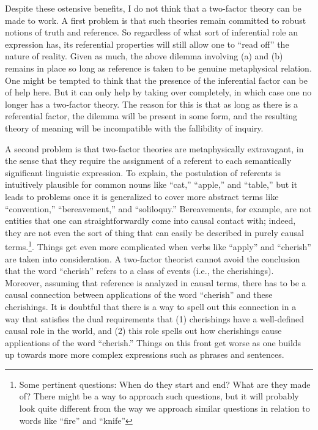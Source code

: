 Despite these ostensive benefits, I do not think that a two-factor theory can be made to work. A first problem is that such theories remain committed to robust notions of truth and reference. So regardless of what sort of inferential role an expression has, its referential properties will still allow one to ``read off'' the nature of reality. Given as much, the above dilemma involving (a) and (b) remains in place so long as reference is taken to be genuine metaphysical relation. One might be tempted to think that the presence of the inferential factor can be of help here. But it can only help by taking over completely, in which case one no longer has a two-factor theory. The reason for this is that as long as there is a referential factor, the dilemma will be present in some form, and the resulting theory of meaning will be incompatible with the fallibility of inquiry. 

A second problem is that two-factor theories are metaphysically extravagant, in the sense that they require the assignment of a referent to each semantically significant linguistic expression. To explain, the postulation of referents is intuitively plausible for common nouns like ``cat,'' ``apple,'' and ``table,'' but it leads to problems once it is generalized to cover more abstract terms like ``convention,'' ``bereavement,'' and ``soliloquy.'' Bereavements, for example, are not entities that one can straightforwardly come into causal contact with; indeed, they are not even the sort of thing that can easily be described in purely causal terms.\footnote{Some pertinent questions: When do they start and end? What are they made of? There might be a way to approach such questions, but it will probably look quite different from the way we approach similar questions in relation to words like ``fire'' and ``knife''}. Things get even more complicated when verbs like ``apply'' and ``cherish'' are taken into consideration. A two-factor theorist cannot avoid the conclusion that the word ``cherish'' refers to a class of events (i.e., the cherishings). Moreover, assuming that reference is analyzed in causal terms, there has to be a causal connection between applications of the word ``cherish'' and these cherishings. It is doubtful that there is a way to spell out this connection in a way that satisfies the dual requirements that (1) cherishings have a well-defined causal role in the world, and (2) this role spells out how cherishings cause applications of the word ``cherish.'' Things on this front get worse as one builds up towards more more complex expressions such as phrases and sentences. 

